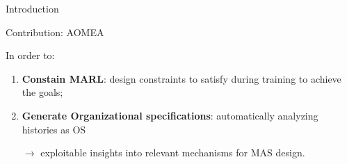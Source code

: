 \begin{frame}[allowframebreaks]{Introduction}
\begin{prosblock}{Contribution: AOMEA}
        \

        In order to:
        \begin{enumerate}
            \item \textbf{Constain MARL}: design constraints to satisfy during training to achieve the goals;
            \item \textbf{Generate Organizational specifications}: automatically analyzing histories as OS
            
            $\rightarrow$ exploitable insights into relevant mechanisms for MAS design.
        \end{enumerate}

    \end{prosblock}


\end{frame}